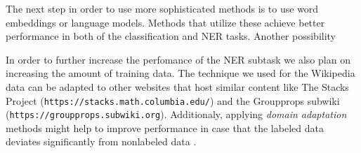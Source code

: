 \documentclass[a4paper]{easychair}
\begin{document}
The next step in order to use more sophisticated methods is to use  word embeddings or language models. Methods that utilize these achieve better performance in both of the classification and NER tasks. Another possibility 

In order to further increase the perfomance of the NER subtask we also plan on increasing the amount of training data. The technique we used for the Wikipedia data can be adapted to other websites that host similar content like The Stacks Project (\texttt{https://stacks.math.columbia.edu/}) and the Groupprops subwiki (\texttt{https://groupprops.subwiki.org}). Additionaly, applying  \emph{domain adaptation} methods might help to improve performance in case that the labeled data deviates significantly from nonlabeled data \cite{domainAdaptation}.




\end{document}
